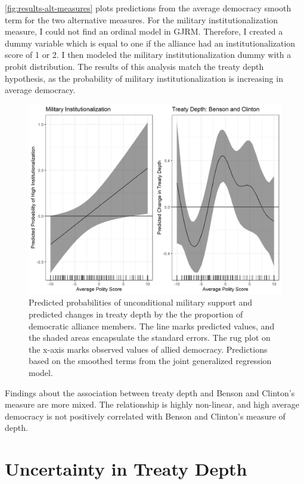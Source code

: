 \documentclass[12pt]{article}
\begin{document}
\autoref{fig:results-alt-measures} plots predictions from the average democracy smooth term for the two alternative measures. 
For the military institutionalization measure, I could not find an ordinal model in GJRM. 
Therefore, I created a dummy variable which is equal to one if the alliance had an institutionalization score of 1 or 2. 
I then modeled the military institutionalization dummy with a probit distribution. 
The results of this analysis match the treaty depth hypothesis, as the probability of military institutionalization is increasing in average democracy. 


\begin{figure}
\includegraphics[width=.95\textwidth]{results-alt-measures.png}  
\caption{Predicted probabilities of unconditional military support and predicted changes in treaty depth by the the proportion of democratic alliance members. The line marks predicted values, and the shaded areas encapsulate the standard errors. The rug plot on the x-axis marks observed values of allied democracy. Predictions based on the smoothed terms from the joint generalized regression model.}
\label{fig:results-alt-measures}
\end{figure}

Findings about the association between treaty depth and Benson and Clinton's measure are more mixed. 
The relationship is highly non-linear, and high average democracy is not positively correlated with Benson and Clinton's measure of depth. 


\section{Uncertainty in Treaty Depth} 
\end{document}
